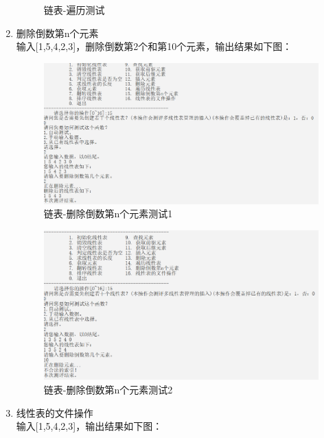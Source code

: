 \documentclass[supercite]{Experimental_Report}
\theoremstyle{definition}
\begin{document}
\begin{enumerate}
\begin{figure}[htb]
\begin{center}
				\caption{链表-遍历测试}
				\label{fig1-16}
			\end{center}
		\end{figure}
		\newpage
		\item 删除倒数第n个元素\\
		输入[1,5,4,2,3]，删除倒数第2个和第10个元素，输出结果如下图：
		\begin{figure}[htb]
			\begin{center}
				\includegraphics[scale=0.60]{images/链表-删除倒数第n个元素.png}
				\caption{链表-删除倒数第n个元素测试1}
				\label{fig1-17.1}
			\end{center}
		\end{figure}
		\begin{figure}[htb]
			\begin{center}
				\includegraphics[scale=0.60]{images/链表-删除倒数第n个元素异常.png}
				\caption{链表-删除倒数第n个元素测试2}
				\label{fig1-17.2}
			\end{center}
		\end{figure}
		\newpage
		\item 线性表的文件操作\\
		输入[1,5,4,2,3]，输出结果如下图：
		\begin{figure}[htb]

\end{figure}
\end{enumerate}
\end{document}
